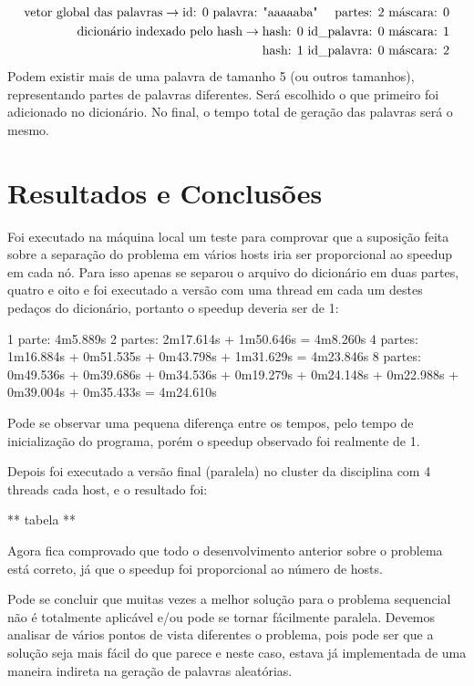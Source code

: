 \documentclass[a4paper]{article}
\begin{document}
\begin{eqnarray*}
	\textrm{vetor global das palavras} \rightarrow \textrm{id: 0 palavra: "aaaaaba" \quad partes: 2 máscara: 0}\\
	\textrm{dicionário indexado pelo hash} \rightarrow \textrm{hash: 0 id\_palavra: 0 máscara: 1}\\
					 \textrm{hash: 1 id\_palavra: 0 máscara: 2}\\
\end{eqnarray*}	
\indent Podem existir mais de uma palavra de tamanho 5 (ou outros tamanhos), representando partes de palavras diferentes. Será escolhido o que primeiro foi adicionado no dicionário. No final, o tempo total de geração das palavras será o mesmo.
	
\section{Resultados e Conclusões}

	Foi executado na máquina local um teste para comprovar que a suposição feita sobre a separação do problema em vários hosts iria ser proporcional ao speedup em cada nó. Para isso apenas se separou o arquivo do dicionário em duas partes, quatro e oito e foi executado a versão com uma thread em cada um destes pedaços do dicionário, portanto o speedup deveria ser de 1:
	
	1 parte: 4m5.889s
	2 partes: 2m17.614s + 1m50.646s = 4m8.260s
	4 partes: 1m16.884s + 0m51.535s + 0m43.798s + 1m31.629s = 4m23.846s
	8 partes: 0m49.536s + 0m39.686s + 0m34.536s + 0m19.279s + 0m24.148s + 0m22.988s + 0m39.004s + 0m35.433s = 4m24.610s
	
	Pode se observar uma pequena diferença entre os tempos, pelo tempo de inicialização do programa, porém o speedup observado foi realmente de 1.
	
	Depois foi executado a versão final (paralela) no cluster da disciplina com 4 threads cada host, e o resultado foi:
	
	** tabela **
	
	Agora fica comprovado que todo o desenvolvimento anterior sobre o problema está correto, já que o speedup foi proporcional ao número de hosts.
	
	Pode se concluir que muitas vezes a melhor solução para o problema sequencial não é totalmente aplicável e/ou pode se tornar fácilmente paralela. Devemos analisar de vários pontos de vista diferentes o problema, pois pode ser que a solução seja mais fácil do que parece e neste caso, estava já implementada de uma maneira indireta na geração de palavras aleatórias.
\end{document}
